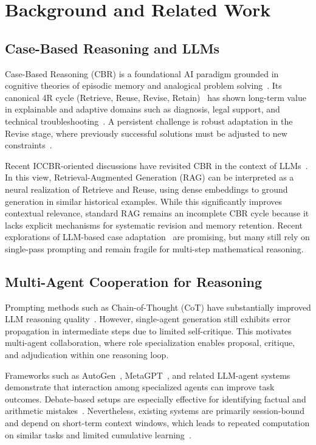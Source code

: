 \section{Background and Related Work}
\vspace{-0.25em}

\subsection{Case-Based Reasoning and LLMs}
Case-Based Reasoning (CBR) is a foundational AI paradigm grounded in cognitive theories of episodic memory and analogical problem solving~\cite{schank1983dynamic}. Its canonical 4R cycle (Retrieve, Reuse, Revise, Retain)~\cite{aamodt1994cbr} has shown long-term value in explainable and adaptive domains such as diagnosis, legal support, and technical troubleshooting~\cite{richter2013textbook}. A persistent challenge is robust adaptation in the Revise stage, where previously successful solutions must be adjusted to new constraints~\cite{leake1996cognition}.

Recent ICCBR-oriented discussions have revisited CBR in the context of LLMs~\cite{leake2023meets,schoenmackers2024neurosymbolic}. In this view, Retrieval-Augmented Generation (RAG) can be interpreted as a neural realization of Retrieve and Reuse, using dense embeddings to ground generation in similar historical examples. While this significantly improves contextual relevance, standard RAG remains an incomplete CBR cycle because it lacks explicit mechanisms for systematic revision and memory retention. Recent explorations of LLM-based case adaptation~\cite{biba2023generative} are promising, but many still rely on single-pass prompting and remain fragile for multi-step mathematical reasoning.

\vspace{-0.25em}
\subsection{Multi-Agent Cooperation for Reasoning}
Prompting methods such as Chain-of-Thought (CoT) have substantially improved LLM reasoning quality~\cite{wei2022chain}. However, single-agent generation still exhibits error propagation in intermediate steps due to limited self-critique. This motivates multi-agent collaboration, where role specialization enables proposal, critique, and adjudication within one reasoning loop.

Frameworks such as AutoGen~\cite{wu2023autogen}, MetaGPT~\cite{hong2023metagpt}, and related LLM-agent systems demonstrate that interaction among specialized agents can improve task outcomes. Debate-based setups are especially effective for identifying factual and arithmetic mistakes~\cite{du2023debate}. Nevertheless, existing systems are primarily session-bound and depend on short-term context windows, which leads to repeated computation on similar tasks and limited cumulative learning~\cite{wang2023agent_survey}.

